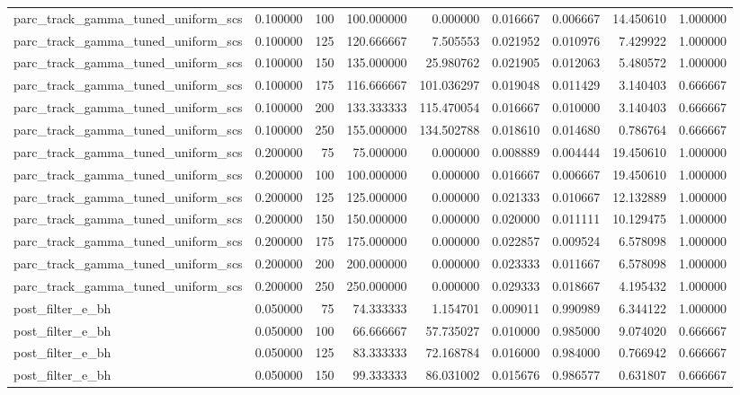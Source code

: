 \begin{tabular}{lrrrrrrrr}
parc_track_gamma_tuned_uniform_scs & 0.100000 & 100 & 100.000000 & 0.000000 & 0.016667 & 0.006667 & 14.450610 & 1.000000 \\
parc_track_gamma_tuned_uniform_scs & 0.100000 & 125 & 120.666667 & 7.505553 & 0.021952 & 0.010976 & 7.429922 & 1.000000 \\
parc_track_gamma_tuned_uniform_scs & 0.100000 & 150 & 135.000000 & 25.980762 & 0.021905 & 0.012063 & 5.480572 & 1.000000 \\
parc_track_gamma_tuned_uniform_scs & 0.100000 & 175 & 116.666667 & 101.036297 & 0.019048 & 0.011429 & 3.140403 & 0.666667 \\
parc_track_gamma_tuned_uniform_scs & 0.100000 & 200 & 133.333333 & 115.470054 & 0.016667 & 0.010000 & 3.140403 & 0.666667 \\
parc_track_gamma_tuned_uniform_scs & 0.100000 & 250 & 155.000000 & 134.502788 & 0.018610 & 0.014680 & 0.786764 & 0.666667 \\
parc_track_gamma_tuned_uniform_scs & 0.200000 & 75 & 75.000000 & 0.000000 & 0.008889 & 0.004444 & 19.450610 & 1.000000 \\
parc_track_gamma_tuned_uniform_scs & 0.200000 & 100 & 100.000000 & 0.000000 & 0.016667 & 0.006667 & 19.450610 & 1.000000 \\
parc_track_gamma_tuned_uniform_scs & 0.200000 & 125 & 125.000000 & 0.000000 & 0.021333 & 0.010667 & 12.132889 & 1.000000 \\
parc_track_gamma_tuned_uniform_scs & 0.200000 & 150 & 150.000000 & 0.000000 & 0.020000 & 0.011111 & 10.129475 & 1.000000 \\
parc_track_gamma_tuned_uniform_scs & 0.200000 & 175 & 175.000000 & 0.000000 & 0.022857 & 0.009524 & 6.578098 & 1.000000 \\
parc_track_gamma_tuned_uniform_scs & 0.200000 & 200 & 200.000000 & 0.000000 & 0.023333 & 0.011667 & 6.578098 & 1.000000 \\
parc_track_gamma_tuned_uniform_scs & 0.200000 & 250 & 250.000000 & 0.000000 & 0.029333 & 0.018667 & 4.195432 & 1.000000 \\
post_filter_e_bh & 0.050000 & 75 & 74.333333 & 1.154701 & 0.009011 & 0.990989 & 6.344122 & 1.000000 \\
post_filter_e_bh & 0.050000 & 100 & 66.666667 & 57.735027 & 0.010000 & 0.985000 & 9.074020 & 0.666667 \\
post_filter_e_bh & 0.050000 & 125 & 83.333333 & 72.168784 & 0.016000 & 0.984000 & 0.766942 & 0.666667 \\
post_filter_e_bh & 0.050000 & 150 & 99.333333 & 86.031002 & 0.015676 & 0.986577 & 0.631807 & 0.666667 \\

\end{tabular}
